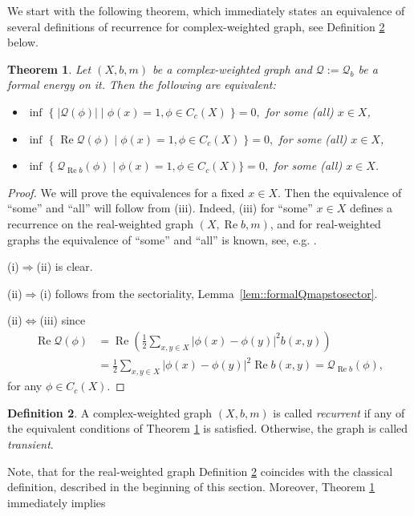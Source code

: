 \documentclass[a4paper,11pt]{amsart}
\newtheorem{theorem}{Theorem}[section]
\theoremstyle{definition}
\newtheorem{definition}[theorem]{Definition}
\renewcommand{\Re}{\operatorname{Re}}%
\newcommand{\Q}{\mathcal{Q}}
\begin{document}
We start with the following theorem, which immediately states an equivalence of several definitions of recurrence for complex-weighted graph, see Definition \ref{def::rec} below. 
\begin{theorem}\label{thm::rec}
Let $(X,b,m)$ be a complex-weighted graph and $\Q:=\Q_b$ be a formal energy on  it. Then the following are equivalent:
\begin{itemize}
\item[{\em (i)}]
$\inf \;\{\;|\Q(\phi)|\;|\;\phi(x)=1, \phi\in C_c(X)\;\}=0,$ for some (all) $x\in X$,
\item[{\em (ii)}]
$\inf \;\{\;\Re \Q(\phi)\;|\;\phi(x)=1, \phi\in C_c(X)\;\}=0,$ for some (all) $x\in X$,
\item[{\em (iii)}]
$\inf \;\{\;\Q_{\Re b}(\phi)\;|\;\phi(x)=1, \phi\in C_c(X)\}=0,$ for some (all) $x\in X$.
\end{itemize}
\end{theorem}

\begin{proof}
We will prove the equivalences for a fixed $x\in X$. Then the equivalence of ``some'' and ``all''  will follow from (iii). Indeed, (iii) for ``some'' $x\in X$ defines a recurrence on the real-weighted graph $(X,\Re b,m)$, and  for real-weighted graphs the equivalence of ``some'' and ``all''  is known, see, e.g. \cite[Theorem 6.1 (vii)]{KellerLenzWojcBook}.

(i)$\Rightarrow$(ii) is clear.

(ii)$\Rightarrow$(i) follows from the sectoriality, Lemma~\ref{lem::formalQmapstosector}.

(ii)$\Leftrightarrow$(iii) since 
\begin{align*}
\Re \Q(\phi)&=\Re \left(\frac 12 \sum_{x,y\in X}|\phi(x)-\phi(y)|^2 b(x,y)\right)\\
&=\frac 12 \sum_{x,y\in X}|\phi(x)-\phi(y)|^2 \Re b(x,y)=\mathcal Q_{\Re b}(\phi),
\end{align*}
for any $\phi\in C_c(X)$.

\end{proof}

\begin{definition}\label{def::rec} A complex-weighted graph $(X,b,m)$ is called {\em recurrent} if any of the equivalent conditions of Theorem \ref{thm::rec} is satisfied. Otherwise, the graph is called {\em transient}.
\end{definition}

Note, that for the real-weighted graph Definition \ref{def::rec} coincides with the classical definition, described in the beginning of this section. Moreover, Theorem \ref{thm::rec} immediately implies
\end{document}
